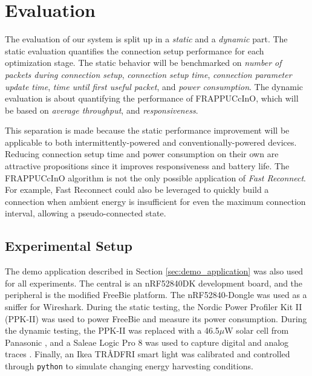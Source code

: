 \chapter{Evaluation}
\label{chp:chapter_4}
The evaluation of our system is split up in a \textit{static} and a \textit{dynamic} part. The static evaluation quantifies the connection setup performance for each optimization stage. The static behavior will be benchmarked on \textit{number of packets during connection setup}, \textit{connection setup time}, \textit{connection parameter update time}, \textit{time until first useful packet}, and \textit{power consumption}. The dynamic evaluation is about quantifying the performance of FRAPPUCcInO, which will be based on \textit{average throughput}, and \textit{responsiveness}.

This separation is made because the static performance improvement will be applicable to both intermittently-powered and conventionally-powered devices. Reducing connection setup time and power consumption on their own are attractive propositions since it improves responsiveness and battery life. The FRAPPUCcInO algorithm is not the only possible application of \textit{Fast Reconnect}. For example, Fast Reconnect could also be leveraged to quickly build a connection when ambient energy is insufficient for even the maximum connection interval, allowing a pseudo-connected state. 

\section{Experimental Setup}
\label{sec:evaluation_setup}
The demo application described in Section \ref{sec:demo_application} was also used for all experiments. The central is an nRF52840DK development board, and the peripheral is the modified FreeBie platform. The nRF52840-Dongle was used as a sniffer for Wireshark. During the static testing, the Nordic Power Profiler Kit II (PPK-II) was used to power FreeBie and measure its power consumption. During the dynamic testing, the PPK-II was replaced with a 46.5$\mu\text{W}$ solar cell from Panasonic \cite{panasonic_solar}, and a Saleae Logic Pro 8 was used to capture digital and analog traces \cite{saleae_logic_pro_8}. Finally, an Ikea TRÅDFRI smart light was calibrated and controlled through \texttt{python} to simulate changing energy harvesting conditions. 

